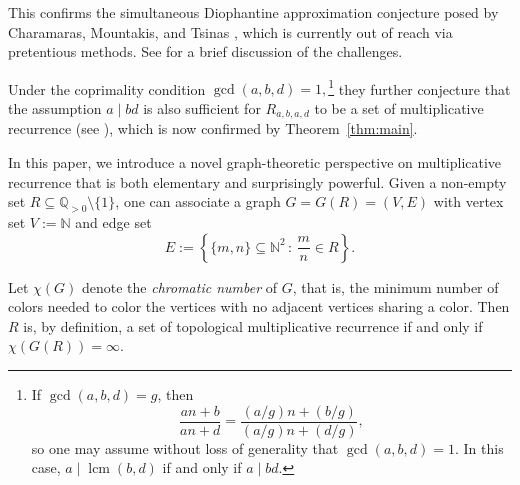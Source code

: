 \documentclass[12pt, reqno, a4paper]{amsart}
\theoremstyle{definition}
\theoremstyle{remark}
\numberwithin{equation}{section}
\begin{document}
 This confirms the simultaneous Diophantine approximation conjecture posed by Charamaras, Mountakis, and Tsinas \cite[Conjecture 2]{charamaras2024multiplicativerecurrencelinearpatterns}, which is currently out of reach via pretentious methods. See \cite[Section 1.4]{charamaras2024multiplicativerecurrencelinearpatterns} for a brief discussion of the challenges.

Under the coprimality condition $\operatorname{gcd}(a,b,d)=1,$\footnote{If \( \gcd(a, b, d) = g  \), %
then
\[
\frac{an + b}{an + d} = \frac{(a/g)n + (b/g)}{(a/g)n + (d/g)},
\]
so one may assume without loss of generality that \( \gcd(a, b, d) = 1 \).
In this case, \( a \mid \operatorname{lcm}(b, d) \) if and only if \( a \mid bd \).
} they further conjecture that the assumption $a \mid bd$ is also sufficient for \( R_{a,b,a,d} \) to be a set of multiplicative recurrence (see \cite[Conjecture 1]{charamaras2024multiplicativerecurrencelinearpatterns}), which is now confirmed by  %
Theorem~\ref{thm:main}.

In this paper, we introduce a novel graph-theoretic perspective on multiplicative recurrence that is both elementary and surprisingly powerful. Given a non-empty set \( R \subseteq \mathbb{Q}_{>0} \setminus \{1\} \), one can associate a graph \( G = G(R) = (V, E) \) with vertex set \( V := \mathbb{N} \) and edge set
\[
E := \left\{ \{m,n\} \subseteq \mathbb{N}^2 \,:\, \frac{m}{n} \in R \right\}.
\]

Let \( \chi(G) \) denote the \emph{chromatic number} of \( G \), that is, the minimum number of colors needed to color the vertices with no adjacent vertices sharing a color. Then \( R \) is, by definition, a set of topological multiplicative recurrence if and only if \( \chi(G(R)) = \infty \). 
\end{document}
